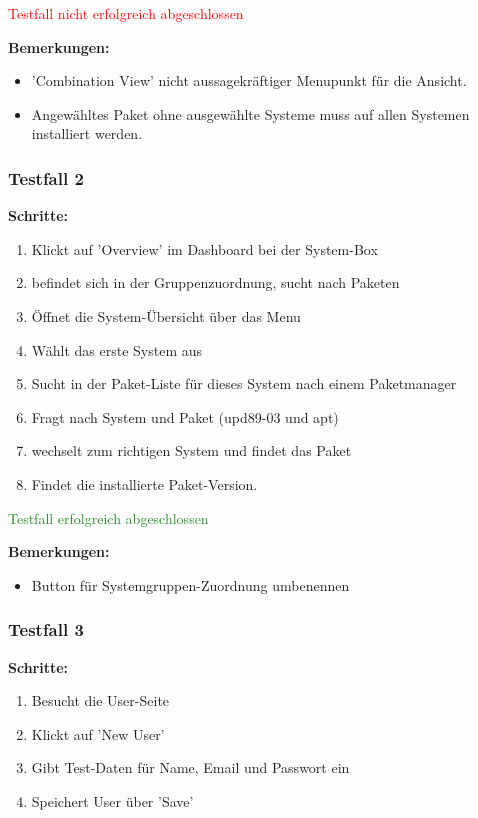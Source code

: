 \textcolor{Red}{Testfall nicht erfolgreich abgeschlossen}

\bigskip
\textbf{Bemerkungen:}

\begin{itemize}[noitemsep,nolistsep]
    \item 'Combination View' nicht aussagekräftiger Menupunkt für die Ansicht.
    \item Angewähltes Paket ohne ausgewählte Systeme muss auf allen Systemen installiert werden.
\end{itemize}


\subsubsection*{Testfall 2}

\textbf{Schritte:}

\begin{enumerate}
    \item Klickt auf 'Overview' im Dashboard bei der System-Box
    \item befindet sich in der Gruppenzuordnung, sucht nach Paketen
    \item Öffnet die System-Übersicht über das Menu
    \item Wählt das erste System aus
    \item Sucht in der Paket-Liste für dieses System nach einem Paketmanager
    \item Fragt nach System und Paket (upd89-03 und apt)
    \item wechselt zum richtigen System und findet das Paket
    \item Findet die installierte Paket-Version.
\end{enumerate}

\textcolor{ForestGreen}{Testfall erfolgreich abgeschlossen}

\bigskip
\textbf{Bemerkungen:}

\begin{itemize}[noitemsep,nolistsep]
    \item Button für Systemgruppen-Zuordnung umbenennen
\end{itemize}


\subsubsection*{Testfall 3}

\textbf{Schritte:}

\begin{enumerate}
    \item Besucht die User-Seite
    \item Klickt auf 'New User'
    \item Gibt Test-Daten für Name, Email und Passwort ein
    \item Speichert User über 'Save'
\end{enumerate}

